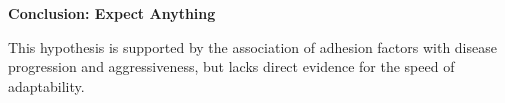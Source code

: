 \textbf{Conclusion: Expect Anything}




This hypothesis is supported by the association of adhesion
factors with disease progression and aggressiveness, but lacks direct evidence
for the speed of adaptability.


























